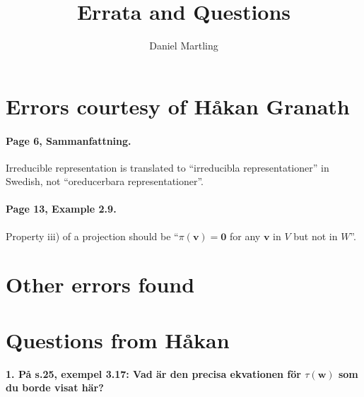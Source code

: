 \documentclass[12pt,a4paper]{article}
\title{Errata and Questions}
\author{Daniel Martling}
\date{}
\theoremstyle{definition}
\theoremstyle{remark}
\numberwithin{equation}{section}
\newcommand{\1}{\mathbf{1}}
\newcommand{\0}{\mathbf{0}}
\newcommand{\vvec}{\mathbf{v}}
\newcommand{\wvec}{\mathbf{w}}
\begin{document}
	\maketitle
	
	\section*{Errors courtesy of Håkan Granath}
	
		\paragraph{Page 6, Sammanfattning.} Irreducible representation is translated to ``irreducibla representationer'' in Swedish, not ``oreducerbara representationer''.
		
		\paragraph{Page 13, Example 2.9.} Property iii) of a projection should be ``$\pi(\vvec) = \0$ for any $\vvec$ in $V$ but not in $W$''.
		
	\section*{Other errors found}
	
		\paragraph{}
		
	\section*{Questions from Håkan}
	
		\textbf{1. På s.25, exempel 3.17: Vad är den precisa ekvationen för $\tau(\wvec)$ som du borde visat här?}
		
\end{document}
